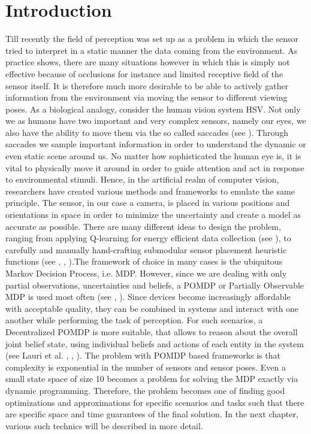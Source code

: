\documentclass[a4paper,11pt,english]{article}
\begin{document}
\section{Introduction}
\label{sec:introduction}
Till recently the field of perception was set up as a problem in which the sensor tried to interpret in a static manner the data coming from the environment. As practice shows, there are many situations however in which this is simply not effective because of occlusions for instance and limited receptive field of the sensor itself. It is therefore much more desirable to be able to actively gather information from the environment via moving the sensor to different viewing poses. As a biological analogy, consider the human vision system HSV. Not only we as humans have two important and very complex sensors, namely our eyes, we also have the ability to move them via the so called saccades (see \cite{rolfs2015attention}). Through saccades we sample important information in order to understand the dynamic or even static scene around us. No matter how sophisticated the human eye is, it is vital to physically move it around in order to guide attention and act in response to environmental stimuli.
Hence, in the artificial realm of computer vision, researchers have created various methods and frameworks to emulate the same principle. The sensor, in our case a camera, is placed in various positions and orientations in space in order to minimize the uncertainty and create a model as accurate as possible. There are many different ideas to design the problem, ranging from applying Q-learning for energy efficient data collection (see \cite{di2010adaptive}), to carefully and manually hand-crafting submodular sensor placement heuristic functions (see \cite{nemhauser1978analysis}, \cite{feige1998threshold}, \cite{golovin2011adaptive}).The framework of choice in many cases is the ubiquitous Markov Decision Process, i.e. MDP. However, since we are dealing with only partial observations, uncertainties and beliefs, a POMDP or Partially Observable MDP is used most often (see \cite{eidenberger2010active}, \cite{sridharan2010planning}). Since devices become increasingly affordable with acceptable quality, they can be combined in systems and interact with one another while performing the task of perception. For such scenarios, a Decentralized POMDP is more suitable, that allows to reason about the overall joint belief state, using individual beliefs and actions of each entity in the system (see Lauri et al. \cite{lauri2017multi}, \cite{lauri2019information}, \cite{oliehoek2016concise}). The problem with POMDP based frameworks is that complexity is exponential in the number of sensors and sensor poses. Even a small state space of size 10 becomes a problem for solving the MDP exactly via dynamic programming. Therefore, the problem becomes one of finding good optimizations and approximations for specific scenarios and tasks such that there are specific space and time guarantees of the final solution. In the next chapter, various such technics will be described in more detail.
\end{document}
